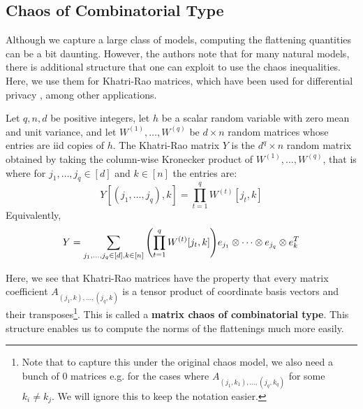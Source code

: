 \subsection{Chaos of Combinatorial Type}
Although we capture a large class of models, computing the flattening quantities can be a bit daunting.
However, the authors note that for many natural models, there is additional structure that one
can exploit to use the chaos inequalities. Here, we use them for Khatri-Rao matrices, which
have been used for differential privacy \cite{krmatrices}, among other applications.

\begin{definition}
    Let $q, n, d$ be positive integers, let $h$ be a scalar random variable with zero mean and unit variance, and let $W^{(1)}, \dots, W^{(q)}$
    be $d \times n$ random matrices whose entries are iid copies of $h$. The Khatri-Rao matrix $Y$ is the $d^q \times n$
    random matrix obtained by taking the column-wise Kronecker product of $W^{(1)}, \dots, W^{(q)}$, that is where 
    for $j_1, \dots, j_q \in [d]$ and $k \in [n]$ the entries are:
    \[ Y[(j_1, \dots, j_q), k] = \prod_{t = 1}^{q} W^{(t)}[j_t, k] \]
    Equivalently,
    \[ Y = \sum_{j_1, \dots, j_q \in [d], k\in[n]} \qty(\prod_{t = 1}^{q} W^{(t)}[j_t, k]) e_{j_1} \otimes \dots \otimes e_{j_q} \otimes e_k^T \]
\end{definition}
Here, we see that Khatri-Rao matrices have the property 
that every matrix coefficient $A_{(j_1, k), \dots, (j_q, k)}$ is a tensor product of coordinate basis vectors and their transposes\footnote{Note that to capture this under the original chaos model,
we also need a bunch of $0$ matrices e.g. for the cases where $A_{(j_1, k_1), \dots, (j_q, k_q)}$ for some $k_i \neq k_j$.
We will ignore this to keep the notation easier.}.
This is called a \textbf{matrix chaos of combinatorial type}. 
This structure enables us to compute the norms of the flattenings much more easily.

